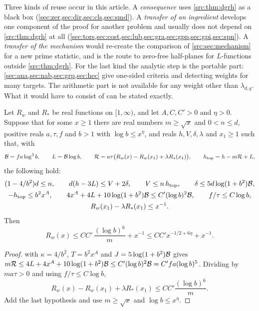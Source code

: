 Three kinds of reuse occur in this article. A \emph{consequence} uses \cref{src:thm:dgrh} as a
black box (\cref{sec:zer,sec:dir,sec:cls,sec:smd}). A \emph{transfer of an ingredient}
develops one component of the proof for another problem and usually does not depend on
\cref{src:thm:dgrh} at all (\cref{sec:tors,sec:cost,sec:lub,sec:gra,sec:gpp,sec:gpi,sec:spn}).
A \emph{transfer of the mechanism} would re-create the comparison of
\cref{src:sec:mechanism} for a new prime statistic, and is the route to zero-free half-planes
for $L$-functions outside \cref{src:thm:dgrh}. For the last kind the analytic step is the
portable part: \cref{sec:ana,sec:nab,sec:grp,sec:hec} give one-sided criteria and detecting
weights for many targets. The arithmetic part is not available for any weight other than
$\lambda_{d,q}$. What it would have to consist of can be stated exactly.

\begin{proposition}\label{src:prop:package}
Let $R_w$ and $R_*$ be real functions on $[1,\infty)$, and let $A,C,C'>0$ and $\eta>0$.
Suppose that for some $x\ge1$ there are real numbers $m\ge\sqrt x$ and $0<n\le d$, positive
reals $a,\tau,f$ and $b>1$ with $\log b\le x^{\eta}$, and reals $h,V,\delta,\lambda$ and
$x_1\ge1$ such that, with
\[
\mathcal{B}=fa\log^3b,\qquad L=\mathcal{B}\log b,\qquad
\mathcal{R}=a\tau\bigl(R_w(x)-R_w(x_1)+\lambda R_*(x_1)\bigr),\qquad h_{\mathrm{top}}=h-m\mathcal{R}+L,
\]
the following hold:
\begin{gather*}
(1-4/b^2)d\le n,\qquad d(h-3L)\le V+2\delta,\qquad V\le n\,h_{\mathrm{top}},\qquad
\delta\le5d\log(1+b^2)\mathcal{B},\\
-h_{\mathrm{top}}\le b^2x^{A},\qquad 4x^{A}+4L+10\log(1+b^2)\mathcal{B}\le C'(\log b)^2\mathcal{B},\qquad
f/\tau\le C\log b,\\
R_w(x_1)-\lambda R_*(x_1)\le x^{-1}.
\end{gather*}
Then
\[
R_w(x)\le CC'\,\frac{(\log b)^6}{m}+x^{-1}\le CC'x^{-1/2+6\eta}+x^{-1} .
\]
\end{proposition}

\begin{proof}
 with $\kappa=4/b^2$, $T=b^2x^A$ and $J=5\log(1+b^2)\mathcal{B}$ gives
$m\mathcal{R}\le4L+4x^A+10\log(1+b^2)\mathcal{B}\le C'(\log b)^2\mathcal{B}=C'fa(\log b)^5$. Dividing by
$ma\tau>0$ and using $f/\tau\le C\log b$,
\[
R_w(x)-R_w(x_1)+\lambda R_*(x_1)\le CC'\frac{(\log b)^6}{m} .
\]
Add the last hypothesis and use $m\ge\sqrt x$ and $\log b\le x^\eta$.
\end{proof}

